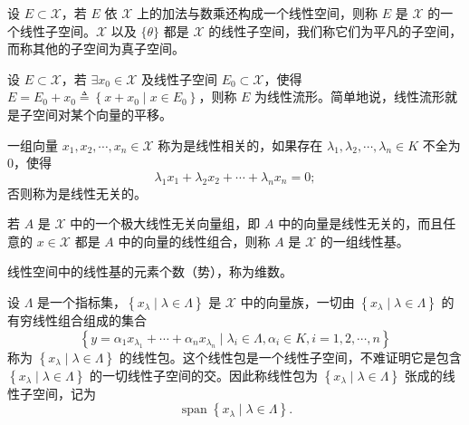 \documentclass[lang=cn,newtx,10pt,scheme=chinese,thmcnt=chapter]{elegantbook}
\begin{document}
\begin{definition}[线性子空间]
设 $E \subset \mathscr{X}$，若 $E$ 依 $\mathscr{X}$ 上的加法与数乘还构成一个线性空间，则称 $E$ 是 $\mathscr{X}$ 的一个线性子空间。$\mathscr{X}$ 以及 $\{\theta\}$ 都是 $\mathscr{X}$ 的线性子空间，我们称它们为平凡的子空间，而称其他的子空间为真子空间。
\end{definition}

\begin{definition}[线性流形]
设 $E \subset \mathscr{X}$，若 $\exists x_0 \in \mathscr{X}$ 及线性子空间 $E_0 \subset \mathscr{X}$，使得 $E = E_0 + x_0 \triangleq \left\{x + x_0 \mid x \in E_0\right\}$，则称 $E$ 为线性流形。简单地说，线性流形就是子空间对某个向量的平移。
\end{definition}

\begin{definition}[线性相关]
一组向量 $x_1, x_2, \cdots, x_n \in \mathscr{X}$ 称为是线性相关的，如果存在 $\lambda_1, \lambda_2, \cdots, \lambda_n \in K$ 不全为 0，使得
\[
\lambda_1 x_1 + \lambda_2 x_2 + \cdots + \lambda_n x_n = 0;
\]
否则称为是线性无关的。
\end{definition}

\begin{definition}[线性基]
若 $A$ 是 $\mathscr{X}$ 中的一个极大线性无关向量组，即 $A$ 中的向量是线性无关的，而且任意的 $x \in \mathscr{X}$ 都是 $A$ 中的向量的线性组合，则称 $A$ 是 $\mathscr{X}$ 的一组线性基。
\end{definition}

\begin{definition}[维数]
线性空间中的线性基的元素个数（势），称为维数。
\end{definition}

\begin{definition}[线性包]
设 $\Lambda$ 是一个指标集，$\left\{x_\lambda \mid \lambda \in \Lambda\right\}$ 是 $\mathscr{X}$ 中的向量族，一切由 $\left\{x_\lambda \mid \lambda \in \Lambda\right\}$ 的有穷线性组合组成的集合
\[
\left\{y = \alpha_1 x_{\lambda_1} + \cdots + \alpha_n x_{\lambda_n} \mid \lambda_i \in \Lambda, \alpha_i \in K, i = 1, 2, \cdots, n\right\}
\]
称为 $\left\{x_\lambda \mid \lambda \in \Lambda\right\}$ 的线性包。这个线性包是一个线性子空间，不难证明它是包含 $\left\{x_\lambda \mid \lambda \in \Lambda\right\}$ 的一切线性子空间的交。因此称线性包为 $\left\{x_\lambda \mid \lambda \in \Lambda\right\}$ 张成的线性子空间，记为
\[
\operatorname{span}\left\{x_\lambda \mid \lambda \in \Lambda\right\}.
\]
\end{definition}
\end{document}
